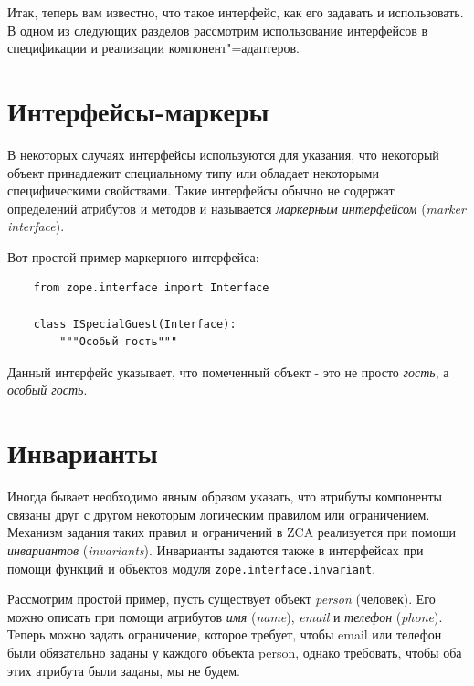 \documentclass[a4paper,openany,twoside,draft]{book}
\providecommand*{\DUroletitlereference}[1]{\textsl{#1}}
\begin{document}
Итак, теперь вам известно, что такое интерфейс, как его задавать и использовать.  В одном из следующих разделов рассмотрим использование интерфейсов в спецификации и реализации компонент"=адаптеров.


\section{Интерфейсы-маркеры%
  \label{id31}%
}

В некоторых случаях интерфейсы используются для указания, что некоторый объект принадлежит специальному типу или обладает некоторыми специфическими свойствами.  Такие интерфейсы обычно не содержат определений атрибутов и методов и называется \DUroletitlereference{маркерным интерфейсом} (\DUroletitlereference{marker interface}).

Вот простой пример маркерного интерфейса:

\begin{verbatim}
    from zope.interface import Interface

    class ISpecialGuest(Interface):
        """Особый гость"""
\end{verbatim}

Данный интерфейс указывает, что помеченный объект - это не просто \DUroletitlereference{гость}, а \DUroletitlereference{особый гость}.


\section{Инварианты%
  \label{id32}%
}

Иногда бывает необходимо явным образом указать, что атрибуты компоненты связаны друг с другом некоторым логическим правилом или ограничением.  Механизм задания таких правил и ограничений в ZCA реализуется при помощи \DUroletitlereference{инвариантов} (\DUroletitlereference{invariants}).  Инварианты задаются также в интерфейсах при помощи функций и объектов модуля \texttt{zope.interface.invariant}.

Рассмотрим простой пример, пусть существует объект \DUroletitlereference{person} (человек).  Его можно описать при помощи атрибутов \DUroletitlereference{имя} (\DUroletitlereference{name}), \DUroletitlereference{email} и \DUroletitlereference{телефон} (\DUroletitlereference{phone}).  Теперь можно задать ограничение, которое требует, чтобы email или телефон были обязательно заданы у каждого объекта person, однако требовать, чтобы оба этих атрибута были заданы, мы не будем.
\end{document}
